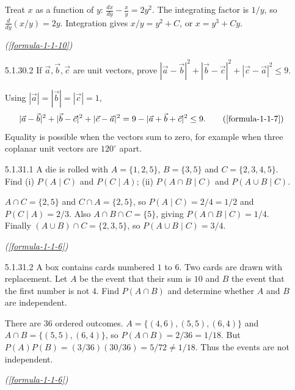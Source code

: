 \begin{enumerate}[label={},font=\normalfont,leftmargin=1.15cm,labelwidth=1.0cm,labelsep=0.15cm,itemindent=0pt,listparindent=0pt,itemsep=\baselineskip,parsep=0pt,topsep=0pt]
Treat $x$ as a function of $y$: $\frac{dx}{dy}-\frac{x}{y}=2y^2$. The integrating factor is $1/y$, so $\frac{d}{dy}(x/y)=2y$. Integration gives $x/y=y^2+C$, or $\boxed{x=y^3+Cy}$.\par\noindent\hfill\mbox{\textit{(\ref{formula-1-1-10})}}\par

\item[5.1.30.2] If $\vec a,\vec b,\vec c$ are unit vectors, prove $|\vec a-\vec b|^2+|\vec b-\vec c|^2+|\vec c-\vec a|^2\le9$.

\vspace{0.6em}\par\solution


Using $|\vec a|=|\vec b|=|\vec c|=1$,
\begin{equation*}
|\vec a-\vec b|^2+|\vec b-\vec c|^2+|\vec c-\vec a|^2
=9-|\vec a+\vec b+\vec c|^2\le9.
\tag*{(\ref{formula-1-1-7})}\end{equation*}
Equality is possible when the vectors sum to zero, for example when three coplanar unit vectors are $120^\circ$ apart.

\item[5.1.31.1] A die is rolled with $A=\{1,2,5\}$, $B=\{3,5\}$ and $C=\{2,3,4,5\}$. Find (i) $P(A\mid C)$ and $P(C\mid A)$; (ii) $P(A\cap B\mid C)$ and $P(A\cup B\mid C)$.

\vspace{0.6em}\par\solution


$A\cap C=\{2,5\}$ and $C\cap A=\{2,5\}$, so $P(A\mid C)=2/4=1/2$ and $P(C\mid A)=2/3$. Also $A\cap B\cap C=\{5\}$, giving $P(A\cap B\mid C)=1/4$. Finally $(A\cup B)\cap C=\{2,3,5\}$, so $P(A\cup B\mid C)=3/4$.\par\noindent\hfill\mbox{\textit{(\ref{formula-1-1-6})}}\par

\item[5.1.31.2] A box contains cards numbered $1$ to $6$. Two cards are drawn with replacement. Let $A$ be the event that their sum is $10$ and $B$ the event that the first number is not $4$. Find $P(A\cap B)$ and determine whether $A$ and $B$ are independent.

\vspace{0.6em}\par\solution


There are $36$ ordered outcomes. $A=\{(4,6),(5,5),(6,4)\}$ and $A\cap B=\{(5,5),(6,4)\}$, so $P(A\cap B)=2/36=1/18$. But $P(A)P(B)=(3/36)(30/36)=5/72\ne1/18$. Thus the events are not independent.\par\noindent\hfill\mbox{\textit{(\ref{formula-1-1-6})}}\par


\end{enumerate}
